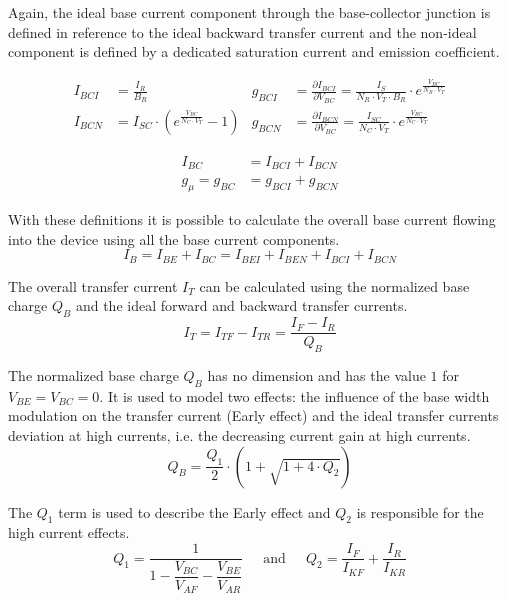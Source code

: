 Again, the ideal base current component through the base-collector
junction is defined in reference to the ideal backward transfer
current and the non-ideal component is defined by a dedicated
saturation current and emission coefficient.

\begin{align}
I_{BCI} &= \frac{I_R}{B_R} &
g_{BCI} &= \frac{\partial I_{BCI}}{\partial V_{BC}} = \frac{I_S}{N_R\cdot V_T \cdot B_R}\cdot e^{\frac{V_{BC}}{N_R\cdot V_T}}\\
I_{BCN} &= I_{SC}\cdot \left(e^{\frac{V_{BC}}{N_C\cdot V_T}} -1\right) &
g_{BCN} &= \frac{\partial I_{BCN}}{\partial V_{BC}} = \frac{I_{SC}}{N_C\cdot V_T}\cdot e^{\frac{V_{BC}}{N_C\cdot V_T}}
\end{align}

\begin{align}
I_{BC} &= I_{BCI} + I_{BCN}\\
g_{\mu} = g_{BC} &= g_{BCI} + g_{BCN}
\end{align}

With these definitions it is possible to calculate the overall base
current flowing into the device using all the base current components.
\begin{equation}
I_B = I_{BE} + I_{BC} = I_{BEI} + I_{BEN} + I_{BCI} + I_{BCN}
\end{equation}

The overall transfer current $I_T$ can be calculated using the
normalized base charge $Q_B$ and the ideal forward and backward
transfer currents.
\begin{equation}
I_T = I_{TF} - I_{TR} = \dfrac{I_F - I_R}{Q_B}
\end{equation}

The normalized base charge $Q_B$ has no dimension and has the value
$1$ for $V_{BE} = V_{BC} = 0$.  It is used to model two effects: the
influence of the base width modulation on the transfer current (Early
effect) and the ideal transfer currents deviation at high currents,
i.e. the decreasing current gain at high currents.
\begin{equation}
Q_B = \frac{Q_1}{2} \cdot \left(1 + \sqrt{1 + 4\cdot Q_2}\right)
\end{equation}

The $Q_1$ term is used to describe the Early effect and $Q_2$ is
responsible for the high current effects.
\begin{equation}
Q_1 = \frac{1}{1 - \dfrac{V_{BC}}{V_{AF}} - \dfrac{V_{BE}}{V_{AR}}}
\;\;\;\; \text{ and } \;\;\;\;
Q_2 = \frac{I_F}{I_{KF}} + \frac{I_R}{I_{KR}}
\end{equation}

